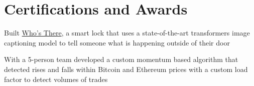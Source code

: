 \documentclass[]{resume-template}
\begin{document}
\begin{minipage}[t]{0.66\textwidth}


        \section{Certifications and Awards}\label{sec:certifications-and-awards}
        \begin{tightemize}
            \item Built \href{https://devpost.com/software/who-s-there-wkdheg}{Who's There}, a smart lock that uses a state-of-the-art transformers image captioning model to tell someone what is happening outside of their door
        \end{tightemize}
        \sectionsep{}
        \begin{tightemize}
            \item With a 5-person team developed a custom momentum based algorithm that detected rises and falls within
            Bitcoin and Ethereum prices with a custom load factor to detect volumes of trades
        \end{tightemize}
        \sectionsep{}


\end{minipage}
\end{document}
